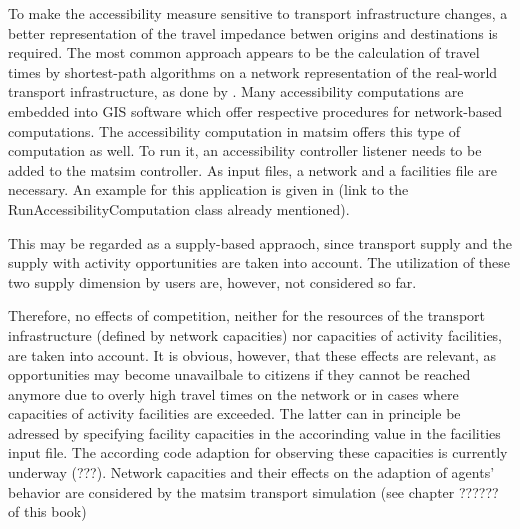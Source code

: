 To make the accessibility measure sensitive to transport infrastructure changes, a better representation of the travel 
impedance betwen origins and destinations is required. The most common approach appears to be the calculation of travel 
times by shortest-path algorithms on a network representation of the real-world transport infrastructure, as \eg done by \citet{BBSR20xxErreichbarkeitsmodell}.
Many accessibility computations are embedded into GIS software which offer respective procedures for network-based 
computations. The accessibility computation in \gls{matsim} offers this type of computation as well. To run it, an 
accessibility controller listener needs to be added to the \gls{matsim} controller. As input files, a network and a 
facilities file are necessary. An example for this application is given in (link to the RunAccessibilityComputation 
class already mentioned).

This may be regarded as a supply-based appraoch, since transport supply and the supply with activity opportunities are 
taken into account. The utilization of these two supply dimension by users are, however, not considered so far.

Therefore, no effects 
of competition, neither for the resources of the transport infrastructure (defined by network capacities) nor capacities 
of activity facilities, are taken into account. It is obvious, however, that these effects are relevant, as opportunities 
may become unavailbale to citizens if they cannot be reached anymore due to overly high travel times on the network or 
in cases where capacities of activity facilities are exceeded. The latter can in principle be adressed by specifying 
facility capacities in the accorinding value in the facilities input file. The according code adaption for observing 
these capacities is currently underway  (???). Network capacities and their effects on the adaption of agents' behavior 
are considered by the \gls{matsim} transport simulation (see chapter ?????? of this book)


